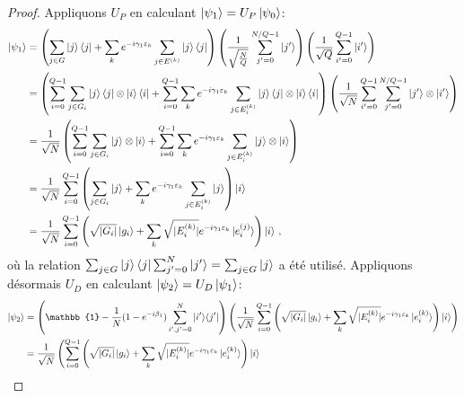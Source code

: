 \begin{proof}
Appliquons $U_{P}$ en calculant $\ket{\psi_{1}} = U_{P} \ket{\psi_{0}}$:
\begin{equation}
\begin{aligned}
    \ket{\psi_{1}} & = \left(\sum_{j \in G} \ket{j}\bra{j} + \sum_{k} e^{-i \gamma_{1} \varepsilon_{k}} \sum_{j \in E^{(k)}} \ket{j}\bra{j} \right) \left( \frac{1}{ \sqrt{ \frac{N}{Q} }} \sum_{j'=0}^{N/Q-1} \ket{j'} \right) \left( \frac{1}{\sqrt{ Q }} \sum_{i'=0}^{Q-1} \ket{i'} \right) \\
    & = \left( \sum_{i=0}^{Q-1} \sum_{j \in G_{i}} \ket{j}\bra{j} \otimes \ket{i}\bra{i} + \sum_{i=0}^{Q-1} \sum_{k} e^{-i \gamma_{1} \varepsilon_{k}} \sum_{j \in E^{(k)}_{i}} \ket{j}\bra{j} \otimes  \ket{i}\bra{i} \right) \left( \frac{1}{ \sqrt{ N }} \sum_{i'=0}^{Q-1} \sum_{j'=0}^{N/Q-1} \ket{j'} \otimes  \ket{i'} \right) \\
    & = \frac{1}{ \sqrt{ N }} \left( \sum_{i=0}^{Q-1} \sum_{j \in G_{i}} \ket{j} \otimes \ket{i} + \sum_{i=0}^{Q-1} \sum_{k} e^{-i \gamma_{1} \varepsilon_{k}} \sum_{j \in E^{(k)}_{i}} \ket{j} \otimes  \ket{i} \right) \\
    & = \frac{1}{ \sqrt{ N }} \sum_{i=0}^{Q-1}  \left( \sum_{j \in G_{i}} \ket{j} + \sum_{k} e^{-i \gamma_{1} \varepsilon_{k}} \sum_{j \in E^{(k)}_{i}} \ket{j} \right) \ket{i} \\
    & = \frac{1}{ \sqrt{ N }} \sum_{i=0}^{Q-1}  \left( \sqrt{ \lvert G_{i} \rvert  } \ket{g_{i}} + \sum_{k} \sqrt{ \lvert E^{(k)}_{i} \rvert  } e^{-i \gamma_{1} \varepsilon_{k}} \ket{e^{(j)}_{i}} \right) \ket{i} \,,
\end{aligned}
\end{equation}
où la relation $\sum_{j \in G}\ket{j}\bra{j} \sum_{j'=0}^{N} \ket{j'} = \sum_{j \in G} \ket{j}$ a été utilisé. Appliquons désormais $U_{D}$ en calculant $\ket{\psi_{2}} = U_{D}\ket{\psi_{1}}$:
\begin{equation}
\begin{aligned}
    \ket{\psi_{2}} &= \left( \mathbb{1} - \frac{1}{N} (1 - e^{-i\beta_{1}}) \sum_{i',j'=0}^{N} \ket{i'}\!\bra{j'} \right) \left( \frac{1}{ \sqrt{ N }} \sum_{i=0}^{Q-1}  \left( \sqrt{ \lvert G_{i} \rvert  } \ket{g_{i}} + \sum_{k} \sqrt{ \lvert E^{(k)}_{i} \rvert  } e^{-i \gamma_{1} \varepsilon_{k}}  \ket{e^{(k)}_{i}} \right) \ket{i} \right) \\
    &=  \frac{1}{ \sqrt{ N }} \left(  \sum_{i=0}^{Q-1}  \left( \sqrt{ \lvert G_{i} \rvert  } \ket{g_{i}} + \sum_{k} \sqrt{ \lvert E^{(k)}_{i} \rvert  } e^{-i \gamma_{1} \varepsilon_{k}} \ket{e^{(k)}_{i}} \right) \ket{i} \right. \\

\end{aligned}
\end{equation}
\end{proof}
